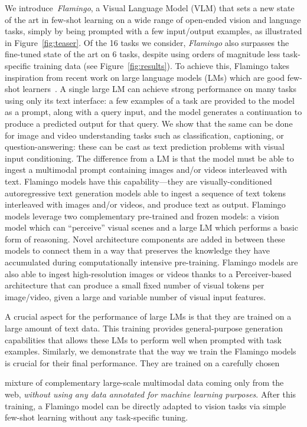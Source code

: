 We introduce~\emph{Flamingo}, a Visual Language Model (VLM) that sets a new state of the art in few-shot learning on a wide range of open-ended vision and language tasks, simply by being prompted with a few input/output examples, as illustrated in Figure~\ref{fig:teaser}.
Of the 16 tasks we consider, \emph{Flamingo} also surpasses the fine-tuned state of the art on 6 tasks, despite using orders of magnitude less task-specific training data (see Figure~\ref{fig:results}).
To achieve this, Flamingo takes inspiration from recent work on large language models (LMs) which are good few-shot learners~\citep{gpt3,gopher,chinchilla,chowdhery2022palm}. A single large LM can achieve strong performance on many tasks using only its text interface: a few examples of a task are provided to the model as a prompt, along with a query input, and the model generates a continuation to produce a predicted output for that query. We show that the same can be done for image and video understanding tasks such as classification, captioning, or question-answering: these can be cast as text prediction problems with visual input conditioning. The difference from a LM is that the model must be able to ingest a multimodal prompt containing images and/or videos interleaved with text. Flamingo models have this capability---they are visually-conditioned autoregressive text generation models able to ingest a sequence of text tokens interleaved with images and/or videos, and produce text as output. Flamingo models leverage two complementary pre-trained and frozen models: a vision model which can ``perceive'' visual scenes and a large LM which performs a basic form of reasoning. Novel architecture components are added in between these models to connect them in a way that preserves the knowledge they have accumulated during computationally intensive pre-training. Flamingo models are also able to ingest high-resolution images or videos thanks to a Perceiver-based~\citep{jaegle2021perceiver} architecture that can produce a small fixed number of visual tokens per image/video, given a large and variable number of visual input features.

\parbox{\textwidth}{A crucial aspect for the performance of large LMs is that they are trained on a large amount of text data. This training provides general-purpose generation capabilities that allows these LMs to perform well when prompted with task examples. Similarly, we demonstrate that the way we train the Flamingo models is crucial for their final performance. They are trained on a carefully chosen \parfillskip=0pt}  mixture of complementary large-scale multimodal data coming only from the web, \emph{without using any data annotated for machine learning purposes}. After this training, a Flamingo model can be directly adapted to vision tasks via simple few-shot learning without any task-specific tuning.

